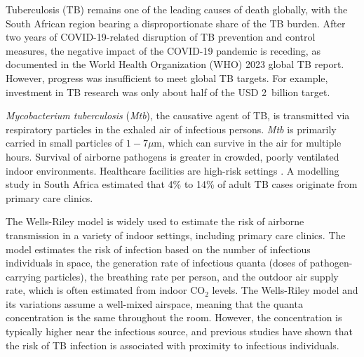 \documentclass[fleqn,11pt]{wlscirep}
\begin{document}
Tuberculosis (TB) remains one of the leading causes of death globally, with the South African region bearing a disproportionate share of the TB burden.  After two years of COVID-19-related disruption of TB prevention and control measures, the negative impact of the COVID-19 pandemic is receding, as documented in the World Health Organization (WHO) 2023 global TB report\cite{WHO2023TBReport}. However, progress was insufficient to meet global TB targets\cite{WHO2023TBReport}. For example, investment in TB research was only about half of the USD 2~billion target\cite{WHO2023TBReport}.

\emph{Mycobacterium tuberculosis} (\emph{Mtb}), the causative agent of TB, is transmitted via respiratory particles in the exhaled air of infectious persons\cite{Rieder1999,Patterson2021Tuberculosis}. \emph{Mtb} is primarily carried in small particles of $1-7\mu$m\cite{Fennelly2020Lancet}, which can survive in the air for multiple hours\cite{Loudon1969AMRRD}. Survival of airborne pathogens is greater in crowded, poorly ventilated indoor environments\cite{Rieder1999,CPS2013Book,Nardell1991ARRD,Wang2021Science,Morawska2021}. Healthcare facilities are high-risk settings \cite{McCreesh2020IJTLD}. A modelling study in South Africa estimated that 4\% to 14\% of adult TB cases originate from primary care clinics\cite{McCreesh2022BMJGlobalHealth}.

The Wells-Riley model\cite{Riley1961Book} is widely used to estimate the risk of airborne transmission in a variety of indoor settings\cite{Haddrell2024NatCommun,Andrews2014JID,Taylor2016IJTLD,Hella2017JInfect,Zemouri2020JDR}, including primary care clinics\cite{Zurcher2022JID,McCreesh2021BMJGlobalHealth}. The model estimates the risk of infection based on the number of infectious individuals in space, the generation rate of infectious quanta (doses of pathogen-carrying particles), the breathing rate per person, and the outdoor air supply rate, which is often estimated from indoor CO$_2$ levels\cite{Rudnick2003IndoorAir,Richardson2014PONE,Haddrell2024NatCommun}. The Wells-Riley model and its variations\cite{Rudnick2003IndoorAir} assume a well-mixed airspace, meaning that the quanta concentration is the same throughout the room. However, the concentration is typically higher near the infectious source\cite{Wang2021Science,Vuorinen2020SafSci,Chen2020BuildEnv}, and previous studies have shown that the risk of TB infection is associated with proximity to infectious individuals\cite{Ko2004RiskAnal,Kenyon1996NEJM}.
\end{document}
